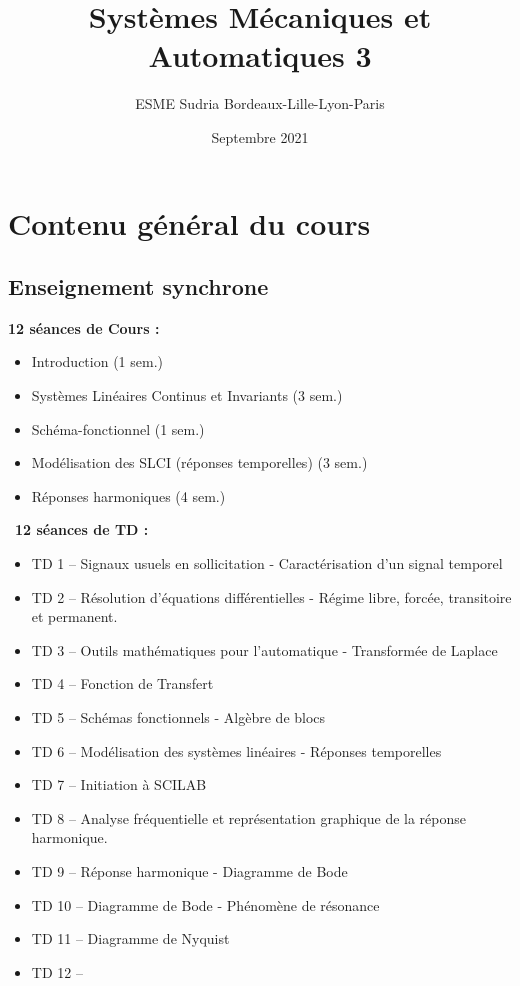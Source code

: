 \documentclass[a4paper,11pt]{article}
\title{Systèmes Mécaniques et Automatiques 3}
\date{Septembre 2021}
\author{ESME Sudria Bordeaux-Lille-Lyon-Paris}
\begin{document}
\maketitle

\section*{Contenu général du cours}

\subsection*{Enseignement synchrone}

\noindent \textbf{12 séances de Cours :}
\begin{itemize}
    \item Introduction                                   \hfill (1 sem.)
    \item Systèmes Linéaires Continus et Invariants      \hfill (3 sem.)
    \item Schéma-fonctionnel                             \hfill (1 sem.)
    \item Modélisation des SLCI (réponses temporelles)   \hfill (3 sem.)
    \item Réponses harmoniques                           \hfill (4 sem.)
\end{itemize}
$\,$\newline
\noindent \textbf{12 séances de TD :}
\begin{itemize}
    \item TD 1  -- Signaux usuels en sollicitation - Caractérisation d'un signal temporel
    \item TD 2  -- Résolution d'équations différentielles - Régime libre, forcée, transitoire et permanent.
    \item TD 3  -- Outils mathématiques pour l'automatique - Transformée de Laplace
    \item TD 4  -- Fonction de Transfert
    \item TD 5  -- Schémas fonctionnels - Algèbre de blocs
    \item TD 6  -- Modélisation des systèmes linéaires - Réponses temporelles
    \item TD 7  -- Initiation à SCILAB    
    \item TD 8  -- Analyse fréquentielle et représentation graphique de la réponse harmonique.
    \item TD 9  -- Réponse harmonique - Diagramme de Bode
    \item TD 10 -- Diagramme de Bode - Phénomène de résonance
    \item TD 11 -- Diagramme de Nyquist
    \item TD 12 -- 
\end{itemize}
\end{document}
